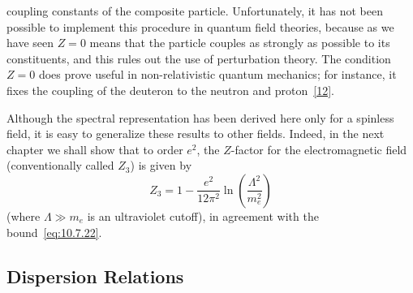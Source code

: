 
coupling constants of the composite particle. Unfortunately, it has not
been possible to implement this procedure in quantum field theories,
because as we have seen $Z=0$ means that the particle couples as strongly
as possible to its constituents, and this rules out the use of perturbation
theory. The condition $Z=0$ does prove useful in non-relativistic quantum
mechanics; for instance, it fixes the coupling of the deuteron to the neutron
and proton~\hyperref[ref:10.12]{[12]}.

Although the spectral representation has been derived here only for a
spinless field, it is easy to generalize these results to other fields. Indeed,
in the next chapter we shall show that to order $e^2$, the $Z$-factor for the
electromagnetic field (conventionally called $Z_3$) is given by
\begin{equation*}
  Z_3=1-\frac{e^2}{12\pi^2}\ln\left(\frac{\Lambda^2}{m_e^2}\right)
\end{equation*}
(where $\Lambda\gg m_e$ is an ultraviolet cutoff), in agreement with the
bound~\eqref{eq:10.7.22}.

\subsection[Dispersion Relations]{Dispersion Relations\texorpdfstring{\protect\footnotemark}{}}

